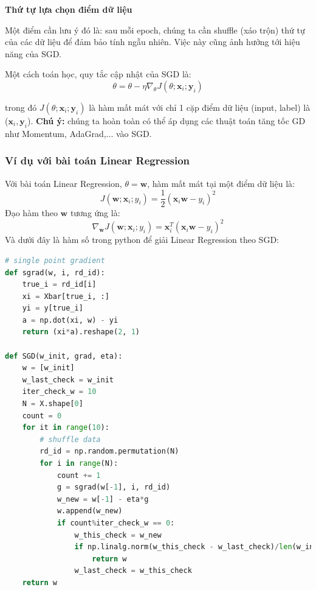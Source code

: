 \textbf{Thứ tự lựa chọn điểm dữ liệu} 
 
Một điểm cần lưu ý đó là: sau mỗi epoch, chúng ta cần shuffle (xáo trộn) thứ tự của các dữ liệu để đảm bảo tính ngẫu nhiên. Việc này cũng ảnh hưởng tới hiệu năng của SGD.  
 
 
Một cách toán học, quy tắc cập nhật của SGD là: 
\begin{equation*} 
\theta = \theta - \eta \nabla_{\theta} J(\theta; \mathbf{x}_i; \mathbf{y}_i) 
\end{equation*} 
 
trong đó $J(\theta; \mathbf{x}_i; \mathbf{y}_i)$ là hàm mất mát với chỉ 1 cặp điểm dữ liệu (input, label) là ($\mathbf{x}_i, \mathbf{y}_i$). \textbf{Chú ý:} chúng ta hoàn toàn có thể áp dụng các thuật toán tăng tốc GD như Momentum, AdaGrad,... vào SGD. 
 
 
\subsubsection{Ví dụ với bài toán Linear Regression}
Với bài toán Linear Regression, $\theta = \mathbf{w}$, hàm mất mát tại một điểm dữ liệu là: 
\begin{equation*} 
J(\mathbf{w}; \mathbf{x}_i; y_i) = \frac{1}{2}(\mathbf{x}_i \mathbf{w} - y_i)^2 
\end{equation*} 
Đạo hàm theo $\mathbf{w}$ tương ứng là: 
\begin{equation*} 
\nabla_{\mathbf{w}}J(\mathbf{w}; \mathbf{x}_i; y_i) = \mathbf{x}_i^T(\mathbf{x}_i \mathbf{w} - y_i)^2 
\end{equation*} 
Và dưới đây là hàm số trong python để giải Linear Regression theo SGD: 
 
 
 
 
 
 
\begin{lstlisting}[language=Python]
# single point gradient 
def sgrad(w, i, rd_id): 
    true_i = rd_id[i] 
    xi = Xbar[true_i, :] 
    yi = y[true_i] 
    a = np.dot(xi, w) - yi 
    return (xi*a).reshape(2, 1) 
 
def SGD(w_init, grad, eta): 
    w = [w_init] 
    w_last_check = w_init 
    iter_check_w = 10 
    N = X.shape[0] 
    count = 0 
    for it in range(10): 
        # shuffle data  
        rd_id = np.random.permutation(N) 
        for i in range(N): 
            count += 1  
            g = sgrad(w[-1], i, rd_id) 
            w_new = w[-1] - eta*g 
            w.append(w_new) 
            if count%iter_check_w == 0: 
                w_this_check = w_new                  
                if np.linalg.norm(w_this_check - w_last_check)/len(w_init) < 1e-3:                                     
                    return w 
                w_last_check = w_this_check 
    return w 
\end{lstlisting}
 
